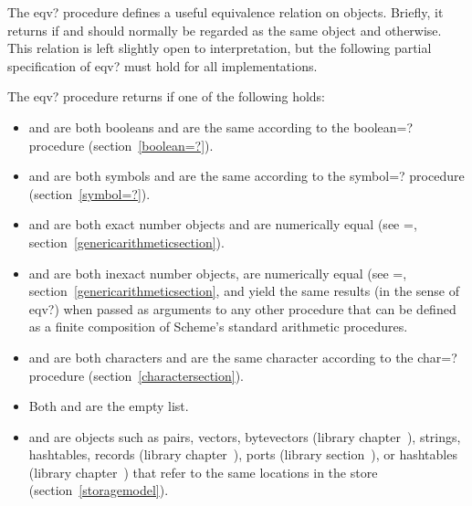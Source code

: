 \begin{entry}{%
}

The {\cf eqv?} procedure defines a useful equivalence relation on objects.
Briefly, it returns \schtrue{} if  and  should
normally be regarded as the same object and \schfalse{} otherwise.  This relation is left slightly
open to interpretation, but the following partial specification of
{\cf eqv?} must hold for all implementations.

The {\cf eqv?} procedure returns \schtrue{} if one of the following holds:

\begin{itemize}
\item {} and  are both booleans and are the same
  according to the {\cf boolean=?} procedure (section~\ref{boolean=?}).

\item {} and  are both symbols and are the same
  according to the {\cf symbol=?} procedure (section~\ref{symbol=?}).

\item {} and  are both exact number objects
  and are numerically equal (see {\cf =}, 
  section~\ref{genericarithmeticsection}).

\item {} and  are both inexact
  number objects, are numerically
  equal (see {\cf =}, section~\ref{genericarithmeticsection}, and
  yield the same results (in the sense of {\cf eqv?}) when passed
  as arguments to any other procedure that can be defined
  as a finite composition of Scheme's standard arithmetic
  procedures.

\item {} and  are both characters and are the same
character according to the {\cf char=?} procedure
(section~\ref{charactersection}).

\item Both  and  are the empty list.

\item {} and  are objects such as pairs, vectors, bytevectors
  (library chapter~),
  strings, hashtables, records (library
  chapter~), ports (library
  section~), or hashtables
  (library chapter~) that
  refer to the same locations in the store (section~\ref{storagemodel}).


\end{itemize}
\end{entry}
